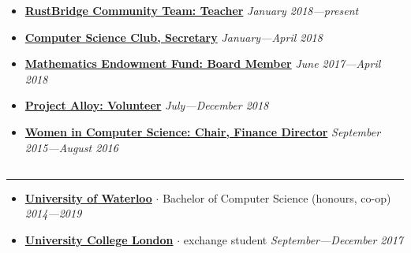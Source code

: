\documentclass[5pt,letterpaper]{article}
\newcommand{\dt}{$\cdot$ }
\begin{document}
\begin{itemize}[leftmargin=1em, noitemsep]
    \item[]
    {\href{https://rustbridge.github.io/}{\textbf{RustBridge Community Team: Teacher}} \hfill
    \emph{January 2018---present}}
    
  \item[]
    {\href{https://csclub.uwaterloo.ca}{\textbf{Computer Science Club, Secretary}} \hfill
    \emph{January---April 2018}}
    
  \item[]
    {\href{https://uwaterloo.ca/math-endowment-fund/}{\textbf{Mathematics
    Endowment Fund: Board Member}} \hfill \emph{June 2017---April 2018}}

  \item[]
    {\href{https://www.projectalloy.org/}{\textbf{Project Alloy: Volunteer}} \hfill
    \emph{July---December 2018}}

  \item[]
    {\href{http://wics.uwaterloo.ca}{\textbf{Women in Computer Science: Chair,
      Finance Director}} \hfill
    \emph{September 2015---August 2016}}

\end{itemize}

\subsection*{}
\hrule
\vspace{1.0em}
\begin{itemize}[leftmargin=1em, noitemsep]
  \item[]
    {\href{http://www.uwaterloo.ca}{\textbf{University of Waterloo}}} \dt Bachelor of Computer Science (honours, co-op) \hfill \emph{2014---2019}
  \item[]
    {\href{https://www.ucl.ac.uk/}{\textbf{University College London}}} \dt exchange student
    \hfill \emph{September---December 2017}

\end{itemize}
\end{document}
